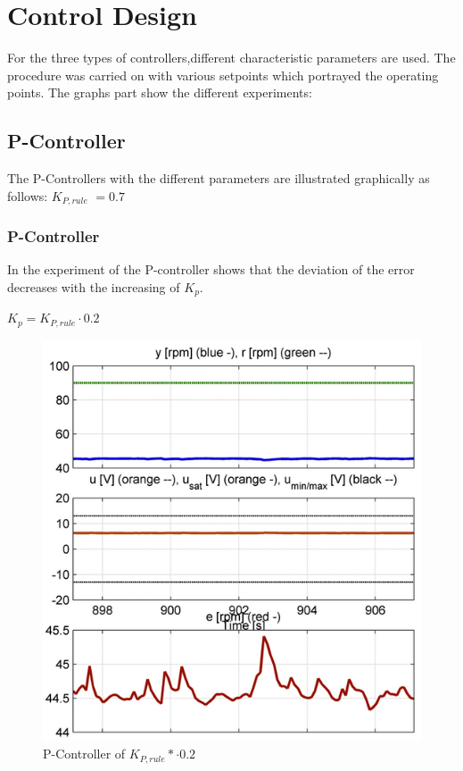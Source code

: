 \section{Control Design}

For the three types of controllers,different characteristic parameters are used. The procedure was carried on with various setpoints which portrayed the operating points. The graphs part show the different experiments:
\subsection{P-Controller}
The P-Controllers with the different parameters are illustrated graphically as follows: \textbf{$K_{P,rule}$} $= 0.7$
\subsubsection{P-Controller}
In the experiment of the P-controller shows that the deviation of the error decreases with the increasing of $K_{p}$.
\begin{center}
{$K_{p}= K_{P,rule}\cdot{0.2}$}
\end{center}

\begin{figure}[H]
\begin{center}
\includegraphics[width=0.6\linewidth]{images/general/P/p_controller02}
\end{center}
\caption{P-Controller of $ K_{P,rule}*\cdot{0.2}$}
\label{fig:p_controller2}
\end{figure}


